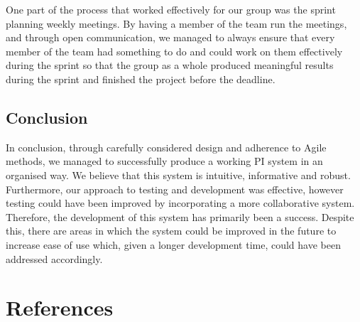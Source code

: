 \documentclass[11pt]{article}
\begin{document}
\newpage

One part of the process that worked effectively for our group was 
the sprint planning weekly meetings. By having a member of the team run the 
meetings, and through open communication, we managed to always ensure that 
every member of the team had something to do and could work on them 
effectively during the sprint so that the group as a whole produced 
meaningful results during the sprint and finished the project before 
the deadline.\par

\subsection{Conclusion}

In conclusion, through carefully considered design and adherence to Agile
methods, we managed to successfully produce a working PI system in an organised
way. We believe that this system is intuitive, informative and robust.
Furthermore, our approach to testing and development was effective, however
testing could have been improved by incorporating a more collaborative system.
Therefore, the development of this system has primarily been a success.
Despite this, there are areas in which the system could be improved in the future
to increase ease of use which, given a longer development time, could have been
addressed accordingly.\par


\newpage
\section{References}
\end{document}
